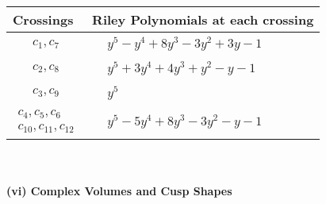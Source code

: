 \documentclass[1p]{elsarticle_modified}
\theoremstyle{definition}
\begin{document}
\begin{tabular}{m{50pt}|m{274pt}}
Crossings & \hspace{64pt}Riley Polynomials at each crossing \\
\hline $$\begin{aligned}c_{1},c_{7}\end{aligned}$$&$\begin{aligned}
&y^5- y^4+8 y^3-3 y^2+3 y-1
\end{aligned}$\\
\hline $$\begin{aligned}c_{2},c_{8}\end{aligned}$$&$\begin{aligned}
&y^5+3 y^4+4 y^3+y^2- y-1
\end{aligned}$\\
\hline $$\begin{aligned}c_{3},c_{9}\end{aligned}$$&$\begin{aligned}
&y^5
\end{aligned}$\\
\hline $$\begin{aligned}c_{4},c_{5},c_{6}\\c_{10},c_{11},c_{12}\end{aligned}$$&$\begin{aligned}
&y^5-5 y^4+8 y^3-3 y^2- y-1
\end{aligned}$\\
\hline
\end{tabular}\\~\\
\newpage\flushleft \textbf{(vi) Complex Volumes and Cusp Shapes}
\end{document}
